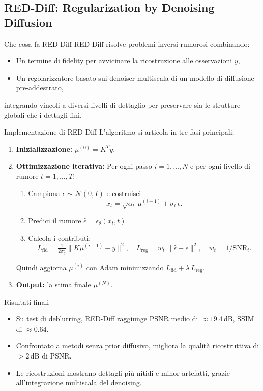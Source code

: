 
\subsection{RED-Diff: Regularization by Denoising Diffusion}

\begin{frame}{Che cosa fa RED-Diff}
  RED-Diff risolve problemi inversi rumorosi combinando:
  \begin{itemize}
    \item Un termine di fidelity per avvicinare la ricostruzione alle osservazioni $y$,
    \item Un regolarizzatore basato sui denoiser multiscala di un modello di diffusione pre-addestrato,
  \end{itemize}
  integrando vincoli a diversi livelli di dettaglio per preservare sia le strutture globali che i dettagli fini.
\end{frame}

\begin{frame}[fragile]{Implementazione di RED-Diff}
  L'algoritmo si articola in tre fasi principali:
  \begin{enumerate}
    \item \textbf{Inizializzazione:} $\mu^{(0)} = K^T y$.
    \item \textbf{Ottimizzazione iterativa:}
      Per ogni passo $i=1,\dots,N$ e per ogni livello di rumore $t=1,\dots,T$:
      \begin{enumerate}
        \item Campiona $\epsilon\sim\mathcal{N}(0,I)$ e costruisci
          \[x_t = \sqrt{\alpha_t}\,\mu^{(i-1)} + \sigma_t\,\epsilon.\]
        \item Predici il rumore $\hat\epsilon = \epsilon_\theta(x_t,t)$.
        \item Calcola i contributi:
          \[
            L_{\mathrm{fid}} = \tfrac{1}{2\sigma_y^2}\|K\mu^{(i-1)} - y\|^2,
            \quad
            L_{\mathrm{reg}} = w_t\,\|\hat\epsilon - \epsilon\|^2,
            \quad w_t = 1/\mathrm{SNR}_t.
          \]
      \end{enumerate}
      Quindi aggiorna $\mu^{(i)}$ con Adam minimizzando $L_{\mathrm{fid}} + \lambda\,L_{\mathrm{reg}}$.
    \item \textbf{Output:} la stima finale $\mu^{(N)}$.
  \end{enumerate}
\end{frame}

\begin{frame}{Risultati finali}
  \begin{itemize}
    \item Su test di deblurring, RED-Diff raggiunge PSNR medio di $\approx19.4\,$dB, SSIM di $\approx0.64$.
    \item Confrontato a metodi senza prior diffusivo, migliora la qualità ricostruttiva di $>2\,$dB di PSNR.
    \item Le ricostruzioni mostrano dettagli più nitidi e minor artefatti, grazie all’integrazione multiscala del denoising.
  \end{itemize}
\end{frame}

